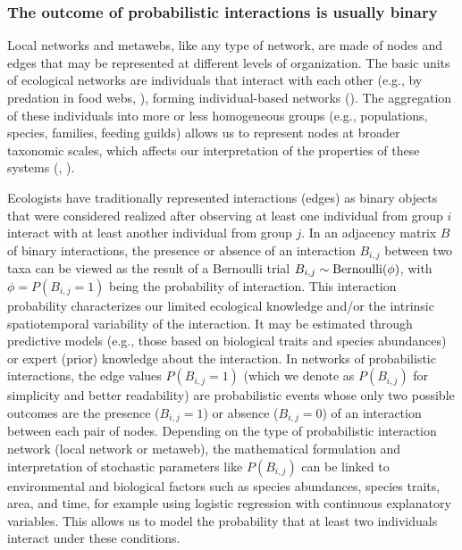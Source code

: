 \subsubsection{The outcome of probabilistic interactions is usually binary}

Local networks and metawebs, like any type of network, are made of nodes and
edges that may be represented at different levels of organization. The basic
units of ecological networks are individuals that interact with each other
(e.g., by predation in food webs, \cite{Elton2001Animal}), forming
individual-based networks (\cite{Melian2011Ecoevolutionary}). The aggregation of
these individuals into more or less homogeneous groups (e.g., populations,
species, families, feeding guilds) allows us to represent nodes at broader
taxonomic scales, which affects our interpretation of the properties of these
systems (\cite{Guimaraes2020Structure}, \cite{Hemprich-Bennett2021Assessing}). 

Ecologists have traditionally represented interactions (edges) as binary objects
that were considered realized after observing at least one individual from group
$i$ interact with at least another individual from group $j$. In an adjacency
matrix $B$ of binary interactions, the presence or absence of an interaction
$B_{i,j}$ between two taxa can be viewed as the result of a Bernoulli trial
$B_{i, j} \sim {\rm Bernoulli}(\phi)$, with $\phi = P(B_{i, j} = 1)$ being the
probability of interaction. This interaction probability characterizes our
limited ecological knowledge and/or the intrinsic spatiotemporal variability of
the interaction. It may be estimated through predictive models (e.g., those
based on biological traits and species abundances) or expert (prior) knowledge
about the interaction. In networks of probabilistic interactions, the edge
values $P(B_{i, j} = 1)$ (which we denote as $P(B_{i, j})$ for simplicity and
better readability) are probabilistic events whose only two possible outcomes
are the presence ($B_{i, j} = 1$) or absence ($B_{i, j} = 0$) of an interaction
between each pair of nodes. Depending on the type of probabilistic interaction
network (local network or metaweb), the mathematical formulation and
interpretation of stochastic parameters like $P(B_{i, j})$ can be linked to
environmental and biological factors such as species abundances, species traits,
area, and time, for example using logistic regression with continuous
explanatory variables. This allows us to model the probability that at least two
individuals interact under these conditions. 

